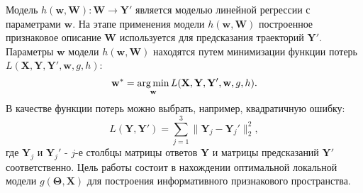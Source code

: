 \documentclass[12pt,twoside]{article}
\begin{document}
Модель $h(\mathbf{w}, \mathbf{W}): \mathbf{W}\to\mathbf{Y}'$ является моделью линейной регрессии с параметрами $\mathbf{w}$. На этапе применения модели $h(\mathbf{w}, \mathbf{W})$ построенное признаковое описание $\mathbf{W}$ используется для предсказания траекторий $\mathbf{Y}'$.
Параметры $\mathbf{w}$ модели $h(\mathbf{w}, \mathbf{W})$ находятся путем минимизации функции потерь $L(\mathbf{X}, \mathbf{Y}, \mathbf{Y}', \mathbf{w}, g, h)$:
\begin{equation}
\mathbf{w^*} = \argmin_{\mathbf{w}} L(\mathbf{X}, \mathbf{Y}, \mathbf{Y}', \mathbf{w}, g, h).
\end{equation}
В качестве функции потерь можно выбрать, например, квадратичную ошибку:
\begin{equation}
L(\mathbf{Y}, \mathbf{Y}') = \sum_{j=1}^{3}\|\mathbf{Y}_j-\mathbf{Y}_j'\|^2_2,
\end{equation}
где $\mathbf{Y}_j$ и $\mathbf{Y}_j'$ - $j$-е столбцы матрицы ответов $\mathbf{Y}$ и матрицы предсказаний $\mathbf{Y}'$ соответственно.
Цель работы состоит в нахождении оптимальной локальной модели $g(\mathbf{\Theta}, \mathbf{X})$ для построения информативного признакового пространства.


\end{document}
